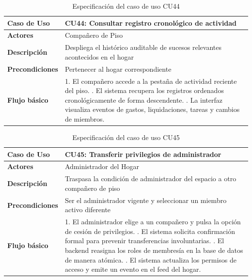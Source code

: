 \begin{table}[H]
\centering
\begin{tabular}{|p{3.2cm}|p{11.3cm}|}
\hline
\textbf{Caso de Uso} & \textbf{CU44: Consultar registro cronológico de actividad} \\ \hline
\textbf{Actores} & Compañero de Piso \\ \hline
\textbf{Descripción} & Despliega el histórico auditable de sucesos relevantes acontecidos en el hogar \\ \hline
\textbf{Precondiciones} & Pertenecer al hogar correspondiente \\ \hline
\textbf{Flujo básico} & 
1. El compañero accede a la pestaña de actividad reciente del piso. \newline
2. El sistema recupera los registros ordenados cronológicamente de forma descendente. \newline
3. La interfaz visualiza eventos de gastos, liquidaciones, tareas y cambios de miembros. \\ \hline
\end{tabular}
\caption{Especificación del caso de uso CU44}
\label{tab:cu44}
\end{table}

\begin{table}[H]
\centering
\begin{tabular}{|p{3.2cm}|p{11.3cm}|}
\hline
\textbf{Caso de Uso} & \textbf{CU45: Transferir privilegios de administrador} \\ \hline
\textbf{Actores} & Administrador del Hogar \\ \hline
\textbf{Descripción} & Traspasa la condición de administrador del espacio a otro compañero de piso \\ \hline
\textbf{Precondiciones} & Ser el administrador vigente y seleccionar un miembro activo diferente \\ \hline
\textbf{Flujo básico} & 
1. El administrador elige a un compañero y pulsa la opción de cesión de privilegios. \newline
2. El sistema solicita confirmación formal para prevenir transferencias involuntarias. \newline
3. El backend reasigna los roles de membresía en la base de datos de manera atómica. \newline
4. El sistema actualiza los permisos de acceso y emite un evento en el feed del hogar. \\ \hline
\end{tabular}
\caption{Especificación del caso de uso CU45}
\label{tab:cu45}
\end{table}

